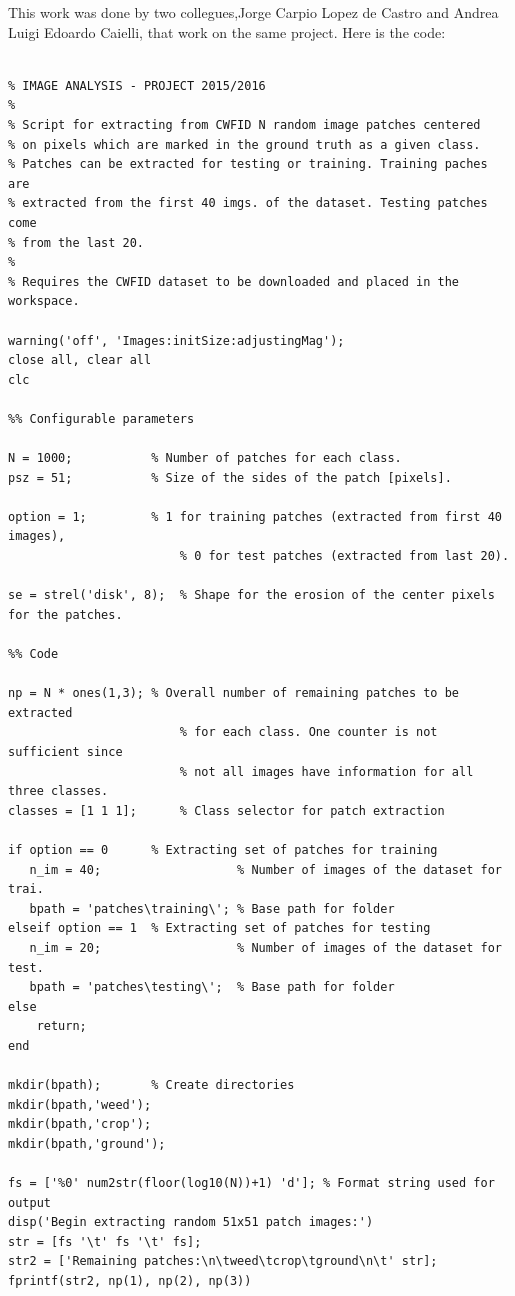 \documentclass[]{report}
\begin{document}
This work was done by two collegues,Jorge Carpio Lopez de Castro and  Andrea Luigi Edoardo Caielli, that work on the same project. 
Here is the code:

\begin{lstlisting}

% IMAGE ANALYSIS - PROJECT 2015/2016
%
% Script for extracting from CWFID N random image patches centered
% on pixels which are marked in the ground truth as a given class.
% Patches can be extracted for testing or training. Training paches are
% extracted from the first 40 imgs. of the dataset. Testing patches come
% from the last 20.
%
% Requires the CWFID dataset to be downloaded and placed in the workspace.

warning('off', 'Images:initSize:adjustingMag');
close all, clear all
clc

%% Configurable parameters

N = 1000;           % Number of patches for each class.
psz = 51;           % Size of the sides of the patch [pixels].

option = 1;         % 1 for training patches (extracted from first 40 images),
                        % 0 for test patches (extracted from last 20).
                        
se = strel('disk', 8);  % Shape for the erosion of the center pixels for the patches.

%% Code

np = N * ones(1,3); % Overall number of remaining patches to be extracted 
                        % for each class. One counter is not sufficient since
                        % not all images have information for all three classes.
classes = [1 1 1];      % Class selector for patch extraction

if option == 0      % Extracting set of patches for training
   n_im = 40;                   % Number of images of the dataset for trai.
   bpath = 'patches\training\'; % Base path for folder
elseif option == 1  % Extracting set of patches for testing
   n_im = 20;                   % Number of images of the dataset for test.
   bpath = 'patches\testing\';  % Base path for folder
else
    return;
end

mkdir(bpath);       % Create directories
mkdir(bpath,'weed'); 
mkdir(bpath,'crop'); 
mkdir(bpath,'ground');

fs = ['%0' num2str(floor(log10(N))+1) 'd']; % Format string used for output
disp('Begin extracting random 51x51 patch images:')
str = [fs '\t' fs '\t' fs];
str2 = ['Remaining patches:\n\tweed\tcrop\tground\n\t' str];
fprintf(str2, np(1), np(2), np(3))


\end{lstlisting}
\end{document}
